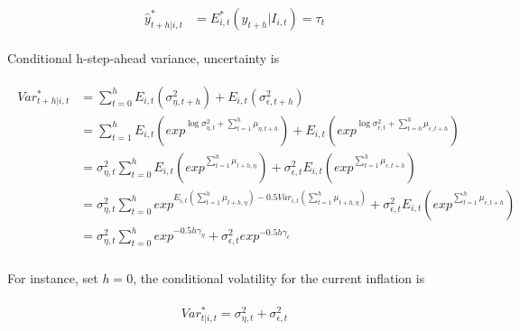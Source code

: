 \documentclass[]{article}
\begin{document}
\begin{eqnarray}
\begin{split}
\hat y^*_{t+h|i,t} & =  E^*_{i,t}(y_{t+h}|I_{i,t}) = \tau_t 
\end{split}
\end{eqnarray}

Conditional h-step-ahead variance, uncertainty is

\begin{eqnarray}
\begin{split}
Var^*_{t+h|i,t} & = \sum^{h}_{t=0} E_{i,t}(\sigma^2_{\eta,t+h}) +  E_{i,t}(\sigma^2_{\epsilon,t+h})  \\
& = \sum^{h}_{t=1} E_{i,t}(exp^{\log \sigma^2_{\eta,t}+\sum^h_{t=1}\mu_{\eta,t+h}}) +  E_{i,t}(exp^{\log \sigma^2_{\epsilon,t}+\sum^h_{t=0}\mu_{\epsilon,t+h}} ) \\
& = \sigma^2_{\eta,t} \sum^{h}_{t=0} E_{i,t}(exp^{\sum^h_{t=1}\mu_{t+h,\eta}}) +  \sigma^2_{\epsilon,t} E_{i,t}(exp^{\sum^h_{t=1}\mu_{\epsilon,t+h}} ) \\
& = \sigma^2_{\eta,t} \sum^{h}_{t=0} exp^{E_{i,t}({\sum^h_{t=1}\mu_{t+h,\eta}})- 0.5Var_{i,t}(\sum^h_{t=1}\mu_{t+h,\eta})} +  \sigma^2_{\epsilon,t} E_{i,t}(exp^{\sum^h_{t=1}\mu_{\epsilon,t+h}} ) \\
& = \sigma^2_{\eta,t} \sum^{h}_{t=0} exp^{- 0.5h\gamma_{\eta}} +  \sigma^2_{\epsilon,t} exp^{- 0.5h\gamma_{\epsilon}}  \\
\end{split} 
\end{eqnarray}

For instance, set $h=0$, the conditional volatility for the current inflation is 


\begin{eqnarray}
\begin{split}
Var^*_{t|i,t} =  \sigma^2_{\eta,t}  +  \sigma^2_{\epsilon,t}
\end{split} 
\end{eqnarray}
\end{document}
